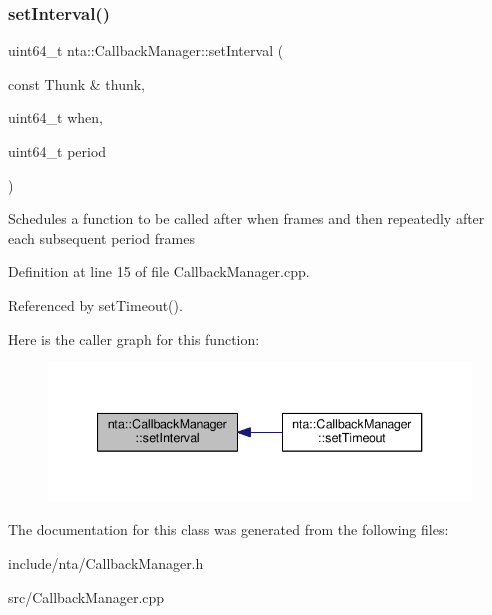 \subsubsection{\texorpdfstring{set\+Interval()}{setInterval()}}
{\footnotesize\ttfamily uint64\+\_\+t nta\+::\+Callback\+Manager\+::set\+Interval (\begin{DoxyParamCaption}\item[{const Thunk \&}]{thunk,  }\item[{uint64\+\_\+t}]{when,  }\item[{uint64\+\_\+t}]{period }\end{DoxyParamCaption})\hspace{0.3cm}{\ttfamily [static]}}

Schedules a function to be called after when frames and then repeatedly after each subsequent period frames 

Definition at line 15 of file Callback\+Manager.\+cpp.



Referenced by set\+Timeout().

Here is the caller graph for this function\+:
\nopagebreak
\begin{figure}[H]
\begin{center}
\leavevmode
\includegraphics[width=340pt]{d1/de6/classnta_1_1CallbackManager_a1fd6132e79e49dbcb787bc8a8507a931_icgraph}
\end{center}
\end{figure}


The documentation for this class was generated from the following files\+:\begin{DoxyCompactItemize}
\item 
include/nta/Callback\+Manager.\+h\item 
src/Callback\+Manager.\+cpp\end{DoxyCompactItemize}
